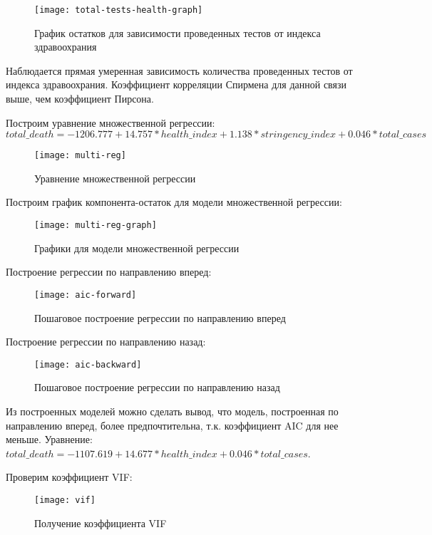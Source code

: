 \documentclass[a4paper,14pt]{extarticle}
\begin{document}
\begin{figure}[H]
    \centering
    \texttt{[image: total-tests-health-graph]}
    \caption{График остатков для зависимости проведенных тестов от индекса здравоохрания}
    \label{fig:total-tests-health-graph}
\end{figure}
Наблюдается прямая умеренная зависимость количества проведенных тестов от
индекса здравоохрания. Коэффициент корреляции Спирмена для данной связи выше,
чем коэффициент Пирсона.
\pagebreak

Построим уравнение множественной регрессии: $total\_death = -1206.777 + 14.757 *
health\_index + 1.138 * stringency\_index + 0.046 * total\_cases$
\begin{figure}[H]
    \centering
    \texttt{[image: multi-reg]}
    \caption{Уравнение множественной регрессии}
    \label{fig:multi-reg}
\end{figure}

Построим график компонента-остаток для модели множественной регрессии:
\begin{figure}[H]
    \centering
    \texttt{[image: multi-reg-graph]}
    \caption{Графики для модели множественной регрессии}
    \label{fig:multi-reg-graph}
\end{figure}

Построение регрессии по направлению вперед:
\begin{figure}[H]
    \centering
    \texttt{[image: aic-forward]}
    \caption{Пошаговое построение регрессии по направлению вперед}
    \label{fig:aic-forward}
\end{figure}
\pagebreak

Построение регрессии по направлению назад:
\begin{figure}[H]
    \centering
    \texttt{[image: aic-backward]}
    \caption{Пошаговое построение регрессии по направлению назад}
    \label{fig:aic-backward}
\end{figure}

Из построенных моделей можно сделать вывод, что модель, построенная по
направлению вперед, более предпочтительна, т.к. коэффициент AIC для нее
меньше. Уравнение: $total\_death = -1107.619 + 14.677 *
health\_index + 0.046 * total\_cases$.
\pagebreak

Проверим коэффициент VIF:
\begin{figure}[H]
    \centering
    \texttt{[image: vif]}
    \caption{Получение коэффициента VIF}
    \label{fig:vif}
\end{figure}
\end{document}
